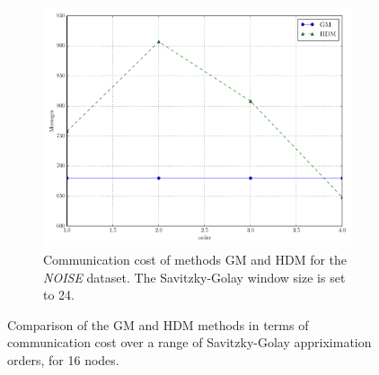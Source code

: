 \begin{figure}[!htb]
\begin{subfigure}{0.32\textwidth}
\end{subfigure}\hfill
\begin{subfigure}{0.32\textwidth}%
  \includegraphics[width=\linewidth]{img/main_msg_noisyinterweaving_order.pdf}
  \caption{Communication cost of methods GM and HDM for the \emph{NOISE} dataset. The Savitzky-Golay window size is set to 24.}
\end{subfigure}
\vspace{0.5cm}
\caption{Comparison of the GM and HDM methods in terms of communication cost over a range of Savitzky-Golay appriximation orders, for 16 nodes.} \label{fig:mainComp-order}
\end{figure}
